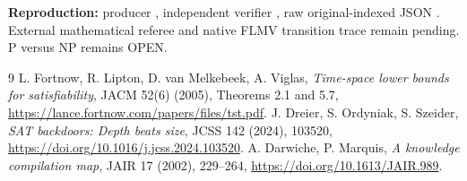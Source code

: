 \documentclass[11pt]{article}
\begin{document}
\textbf{Reproduction:} producer
,
independent verifier
,
raw original-indexed JSON
.
External mathematical referee and native FLMV transition trace remain pending. P versus NP remains OPEN.
\begin{thebibliography}{9}
 L. Fortnow, R. Lipton, D. van Melkebeek, A. Viglas, \emph{Time-space lower bounds for satisfiability}, JACM 52(6) (2005), Theorems 2.1 and 5.7, \url{https://lance.fortnow.com/papers/files/tst.pdf}.
 J. Dreier, S. Ordyniak, S. Szeider, \emph{SAT backdoors: Depth beats size}, JCSS 142 (2024), 103520, \url{https://doi.org/10.1016/j.jcss.2024.103520}.
 A. Darwiche, P. Marquis, \emph{A knowledge compilation map}, JAIR 17 (2002), 229--264, \url{https://doi.org/10.1613/JAIR.989}.
\end{thebibliography}
\end{document}

